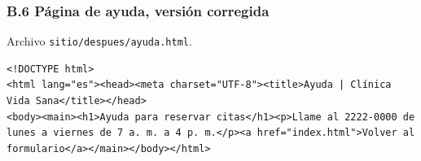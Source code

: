 \documentclass[10pt,letterpaper,onecolumn]{IEEEtran}
\begin{document}
\subsubsection{B.6 Página de ayuda, versión corregida}\label{b.6-puxe1gina-de-ayuda-versiuxf3n-corregida}

Archivo \texttt{sitio/\allowbreak{}\allowbreak{}despues/\allowbreak{}\allowbreak{}ayuda.\allowbreak{}\allowbreak{}html}.

\begin{lstlisting}
<!DOCTYPE html>
<html lang="es"><head><meta charset="UTF-8"><title>Ayuda | Clínica Vida Sana</title></head>
<body><main><h1>Ayuda para reservar citas</h1><p>Llame al 2222-0000 de lunes a viernes de 7 a. m. a 4 p. m.</p><a href="index.html">Volver al formulario</a></main></body></html>
\end{lstlisting}
\end{document}
